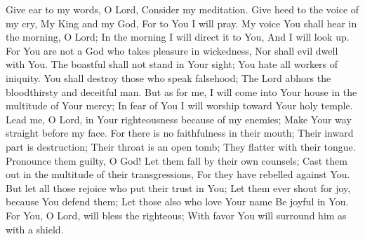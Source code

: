 
Give ear to my words, O Lord, Consider my meditation. Give heed to the voice of my cry, My King and my God, For to You I will pray. My voice You shall hear in the morning, O Lord; In the morning I will direct it to You, And I will look up. For You are not a God who takes pleasure in wickedness, Nor shall evil dwell with You. The boastful shall not stand in Your sight; You hate all workers of iniquity. You shall destroy those who speak falsehood; The Lord abhors the bloodthirsty and deceitful man. But as for me, I will come into Your house in the multitude of Your mercy; In fear of You I will worship toward Your holy temple.\\

\noindent
Lead me, O Lord, in Your righteousness because of my enemies; Make Your way straight before my face. For there is no faithfulness in their mouth; Their inward part is destruction; Their throat is an open tomb; They flatter with their tongue. Pronounce them guilty, O God! Let them fall by their own counsels; Cast them out in the multitude of their transgressions, For they have rebelled against You.\\

\noindent
But let all those rejoice who put their trust in You; Let them ever shout for joy, because You defend them; Let those also who love Your name Be joyful in You. For You, O Lord, will bless the righteous; With favor You will surround him as with a shield.
